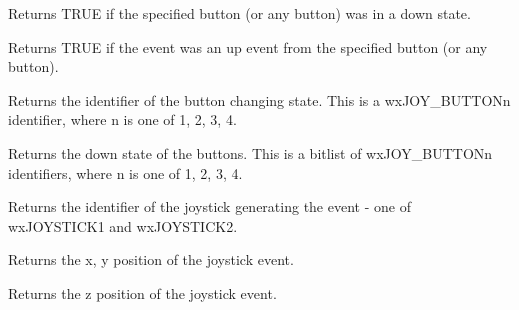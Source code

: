
Returns TRUE if the specified button (or any button) was in a down state.



\label{wxjoystickeventbuttonup}


Returns TRUE if the event was an up event from the specified button (or any button).



\label{wxjoystickeventgetbuttonchange}


Returns the identifier of the button changing state. This is a wxJOY\_BUTTONn identifier, where
n is one of 1, 2, 3, 4.

\label{wxjoystickeventgetbuttonstate}


Returns the down state of the buttons. This is a bitlist of wxJOY\_BUTTONn identifiers, where
n is one of 1, 2, 3, 4.

\label{wxjoystickeventgetjoystick}


Returns the identifier of the joystick generating the event - one of wxJOYSTICK1 and wxJOYSTICK2.

\label{wxjoystickeventgetposition}


Returns the x, y position of the joystick event.

\label{wxjoystickeventgetzposition}


Returns the z position of the joystick event.

